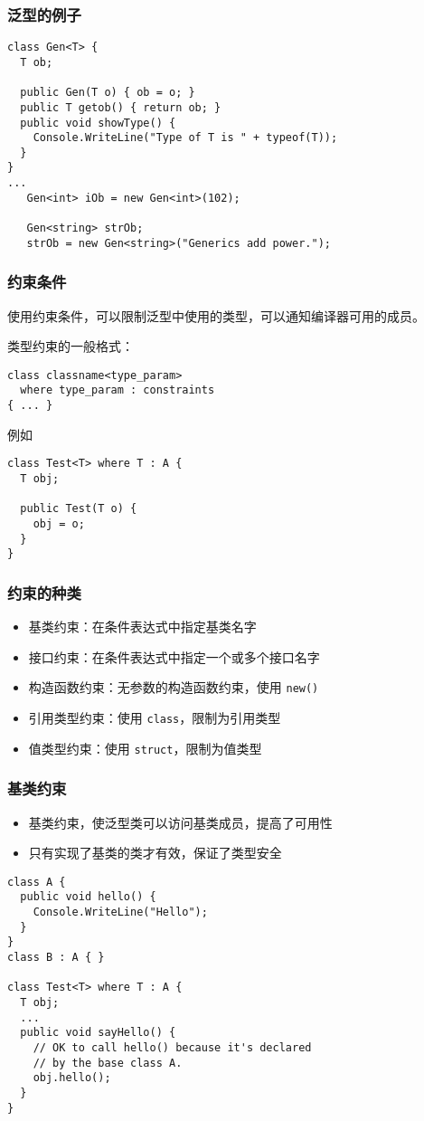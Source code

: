 \begin{frame}[fragile]
\frametitle{泛型的例子}
\begin{lstlisting}
class Gen<T> {
  T ob;

  public Gen(T o) { ob = o; }
  public T getob() { return ob; }
  public void showType() {
    Console.WriteLine("Type of T is " + typeof(T));
  }
}
...
   Gen<int> iOb = new Gen<int>(102);

   Gen<string> strOb;
   strOb = new Gen<string>("Generics add power.");
\end{lstlisting}
\end{frame}


\begin{frame}[fragile]
\frametitle{约束条件}

\CJKindent 使用约束条件，可以限制泛型中使用的类型，可以通知编译器可用的成员。

类型约束的一般格式：
\begin{lstlisting}
class classname<type_param>
  where type_param : constraints
{ ... }
\end{lstlisting}
例如
\begin{lstlisting}
class Test<T> where T : A {
  T obj;

  public Test(T o) {
    obj = o;
  }
}
\end{lstlisting}

\end{frame}


\begin{frame}[fragile]
\frametitle{约束的种类}
\begin{itemize}
\setlength{\itemsep}{8pt plus 1pt}
\item 基类约束：在条件表达式中指定基类名字
\item 接口约束：在条件表达式中指定一个或多个接口名字
\item 构造函数约束：无参数的构造函数约束，使用 \texttt{new()}
\item 引用类型约束：使用 \texttt{class}，限制为引用类型
\item 值类型约束：使用 \texttt{struct}，限制为值类型
\end{itemize}

\end{frame}


\begin{frame}[fragile]
\frametitle{基类约束}
\begin{itemize}
\item 基类约束，使泛型类可以访问基类成员，提高了可用性
\item 只有实现了基类的类才有效，保证了类型安全
\end{itemize}
\begin{lstlisting}
class A {
  public void hello() {
    Console.WriteLine("Hello");
  }
}
class B : A { }

class Test<T> where T : A {
  T obj;
  ...
  public void sayHello() {
    // OK to call hello() because it's declared
    // by the base class A.
    obj.hello();
  }
}

\end{lstlisting}
\end{frame}



